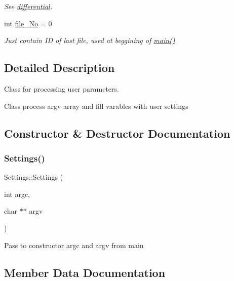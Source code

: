\begin{DoxyCompactItemize}
\begin{DoxyCompactList}\small\item\em See \hyperlink{class_settings_a107556b8673e33e63d1310a73ed4aee7}{differential}. \end{DoxyCompactList}\item 
int \hyperlink{class_settings_abf56e843b1b674afe39d285d0ff5778f}{file\+\_\+\+No} = 0
\begin{DoxyCompactList}\small\item\em Just contain ID of last file, used at beggining of \hyperlink{_get_mic_8cpp_a3c04138a5bfe5d72780bb7e82a18e627}{main()} \end{DoxyCompactList}\end{DoxyCompactItemize}


\subsection{Detailed Description}
Class for processing user parameters. 

Class process argv array and fill varables with user settings 

\subsection{Constructor \& Destructor Documentation}
\mbox{\label{class_settings_a1dc49e08c9e740e0ccab6fa2f54537bd}} 
\subsubsection{\texorpdfstring{Settings()}{Settings()}}
{\footnotesize\ttfamily Settings\+::\+Settings (\begin{DoxyParamCaption}\item[{int}]{argc,  }\item[{char $\ast$$\ast$}]{argv }\end{DoxyParamCaption})}

Pass to constructor argc and argv from main 

\subsection{Member Data Documentation}
\mbox{\label{class_settings_a139c6c8d809e18fec0b3aae2b6286baa}} 
